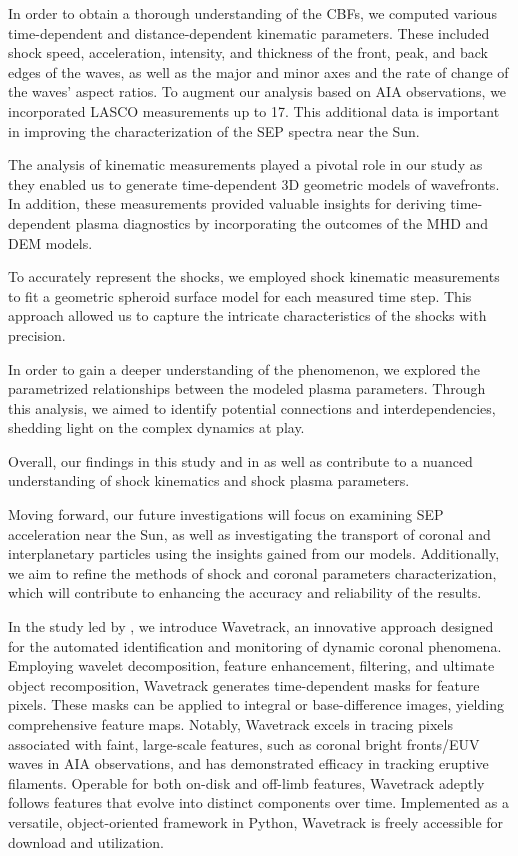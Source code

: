 In order to obtain a thorough understanding of the CBFs, we computed various time-dependent and distance-dependent kinematic parameters. These included shock speed, acceleration, intensity, and thickness of the front, peak, and back edges of the waves, as well as the major and minor axes and the rate of change of the waves' aspect ratios. To augment our analysis based on AIA observations, we incorporated LASCO measurements up to 17\rsun. This additional data is important in improving the characterization of the SEP spectra near the Sun.

The analysis of kinematic measurements played a pivotal role in our study as they enabled us to generate time-dependent 3D geometric models of wavefronts. In addition, these measurements provided valuable insights for deriving time-dependent plasma diagnostics by incorporating the outcomes of the MHD and DEM models.

To accurately represent the shocks, we employed shock kinematic measurements to fit a geometric spheroid surface model for each measured time step. This approach allowed us to capture the intricate characteristics of the shocks with precision.

In order to gain a deeper understanding of the phenomenon, we explored the parametrized relationships between the modeled plasma parameters. Through this analysis, we aimed to identify potential connections and interdependencies, shedding light on the complex dynamics at play.

Overall, our findings in this study and in \citet{kozarev_2022} as well as \citet{stepanyuk_2022} contribute to a nuanced understanding of shock kinematics and shock plasma parameters.

Moving forward, our future investigations will focus on examining SEP acceleration near the Sun, as well as investigating the transport of coronal and interplanetary particles using the insights gained from our models. Additionally, we aim to refine the methods of shock and coronal parameters characterization, which will contribute to enhancing the accuracy and reliability of the results.

In the study led by \citet{stepanyuk_2022}, we introduce Wavetrack, an innovative approach designed for the automated identification and monitoring of dynamic coronal phenomena. Employing wavelet decomposition, feature enhancement, filtering, and ultimate object recomposition, Wavetrack generates time-dependent masks for feature pixels. These masks can be applied to integral or base-difference images, yielding comprehensive feature maps. Notably, Wavetrack excels in tracing pixels associated with faint, large-scale features, such as coronal bright fronts/EUV waves in AIA observations, and has demonstrated efficacy in tracking eruptive filaments.
Operable for both on-disk and off-limb features, Wavetrack adeptly follows features that evolve into distinct components over time. Implemented as a versatile, object-oriented framework in Python, Wavetrack is freely accessible for download and utilization.

